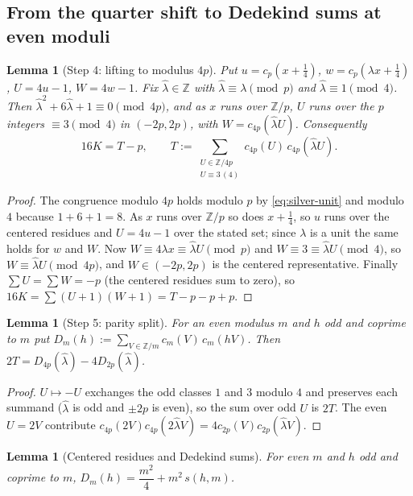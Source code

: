 \documentclass[11pt]{article}
\newtheorem{lemma}[theorem]{Lemma}
\theoremstyle{definition}
\newcommand{\Z}{\mathbb Z}
\begin{document}
\subsection{From the quarter shift to Dedekind sums at even moduli}

\begin{lemma}[Step 4: lifting to modulus $4p$]
\label{lem:C3-step4}
Put $u=c_p(x+\tfrac14)$, $w=c_p(\lambda x+\tfrac14)$, $U=4u-1$,
$W=4w-1$.  Fix $\hat\lambda\in\Z$ with $\hat\lambda\equiv\lambda\pmod p$
and $\hat\lambda\equiv1\pmod4$.  Then $\hat\lambda^2+6\hat\lambda+1\equiv0
\pmod{4p}$, and as $x$ runs over $\Z/p$, $U$ runs over the $p$ integers
$\equiv3\pmod4$ in $(-2p,2p)$, with $W=c_{4p}(\hat\lambda U)$.
Consequently
\begin{equation}
 16K=T-p,\qquad
 T:=\sum_{\substack{U\in\Z/4p\\U\equiv3\,(4)}}c_{4p}(U)\,c_{4p}(\hat\lambda U).
 \label{eq:16K}
\end{equation}
\end{lemma}

\begin{proof}
The congruence modulo $4p$ holds modulo $p$ by \eqref{eq:silver-unit}
and modulo $4$ because $1+6+1=8$.  As $x$ runs over $\Z/p$ so does
$x+\tfrac14$, so $u$ runs over the centered residues and $U=4u-1$ over the
stated set; since $\lambda$ is a unit the same holds for $w$ and $W$.
Now $W\equiv4\lambda x\equiv\hat\lambda U\pmod p$ and
$W\equiv3\equiv\hat\lambda U\pmod4$, so $W\equiv\hat\lambda U\pmod{4p}$,
and $W\in(-2p,2p)$ is the centered representative.  Finally
$\sum U=\sum W=-p$ (the centered residues sum to zero), so
$16K=\sum(U+1)(W+1)=T-p-p+p$.
\end{proof}

\begin{lemma}[Step 5: parity split]
\label{lem:C3-step5}
For an even modulus $m$ and $h$ odd and coprime to $m$ put
$D_m(h):=\sum_{V\in\Z/m}c_m(V)\,c_m(hV)$.  Then
$2T=D_{4p}(\hat\lambda)-4D_{2p}(\hat\lambda)$.
\end{lemma}

\begin{proof}
$U\mapsto-U$ exchanges the odd classes $1$ and $3$ modulo $4$ and
preserves each summand ($\hat\lambda$ is odd and $\pm2p$ is even), so the
sum over odd $U$ is $2T$.  The even $U=2V$ contribute
$c_{4p}(2V)c_{4p}(2\hat\lambda V)=4c_{2p}(V)c_{2p}(\hat\lambda V)$.
\end{proof}

\begin{lemma}[Centered residues and Dedekind sums]
\label{lem:D}
For even $m$ and $h$ odd and coprime to $m$,
$D_m(h)=\dfrac{m^2}4+m^2\,s(h,m)$.
\end{lemma}
\end{document}
